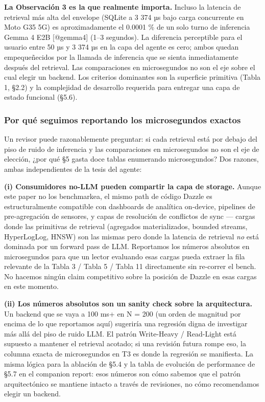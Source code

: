 \textbf{La Observación 3 es la que realmente importa.} Incluso la latencia de
retrieval más alta del envelope (SQLite a 3 374 µs bajo carga concurrente en
Moto G35 5G) es aproximadamente el 0.0001 \% de un solo turno de inferencia
Gemma 4 E2B {[}@gemma4{]} (1--3 segundos). La diferencia perceptible para el
usuario entre 50 µs y 3 374 µs en la capa del agente es cero; ambos quedan
empequeñecidos por la llamada de inferencia que se sienta inmediatamente después
del retrieval. Las comparaciones en microsegundos no son el eje sobre el cual
elegir un backend. Los criterios dominantes son la superficie primitiva (Tabla
1, §2.2) y la complejidad de desarrollo requerida para entregar una capa de
estado funcional (§5.6).

\subsubsection{Por qué seguimos reportando los microsegundos
exactos}\label{por-quuxe9-seguimos-reportando-los-microsegundos-exactos}

Un revisor puede razonablemente preguntar: si cada retrieval está por debajo del
piso de ruido de inferencia y las comparaciones en microsegundos no son el eje
de elección, ¿por qué §5 gasta doce tablas enumerando microsegundos? Dos
razones, ambas independientes de la tesis del agente:

\textbf{(i) Consumidores no-LLM pueden compartir la capa de storage.} Aunque
este paper no los benchmarkea, el mismo path de código Dazzle es
estructuralmente compatible con dashboards de analítica on-device, pipelines de
pre-agregación de sensores, y capas de resolución de conflictos de sync ---
cargas donde las primitivas de retrieval (agregados materializados, bounded
streams, HyperLogLog, HNSW) son las mismas pero donde la latencia de retrieval
\emph{no} está dominada por un forward pass de LLM. Reportamos los números
absolutos en microsegundos para que un lector evaluando esas cargas pueda
extraer la fila relevante de la Tabla 3 / Tabla 5 / Tabla 11 directamente sin
re-correr el bench. No hacemos ningún claim competitivo sobre la posición de
Dazzle en esas cargas en este momento.

\textbf{(ii) Los números absolutos son un sanity check sobre la arquitectura.}
Un backend que se vaya a 100 ms+ en N = 200 (un orden de magnitud por encima de
lo que reportamos aquí) sugeriría una regresión digna de investigar más allá del
piso de ruido LLM. El patrón Write-Heavy / Read-Light está supuesto a mantener
el retrieval acotado; si una revisión futura rompe eso, la columna exacta de
microsegundos en T3 es donde la regresión se manifiesta. La misma lógica para la
ablación de §5.4 y la tabla de evolución de performance de §5.7 en el companion
report: esos números son cómo sabemos que el patrón arquitectónico se mantiene
intacto a través de revisiones, no cómo recomendamos elegir un backend.

